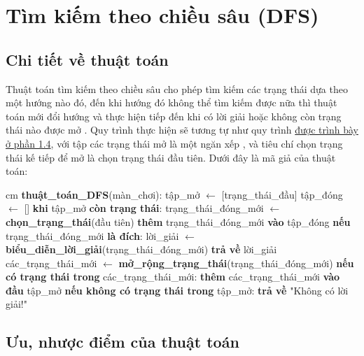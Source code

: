 \section{Tìm kiếm theo chiều sâu (DFS)}
\label{DFS}
\subsection{Chi tiết về thuật toán}
Thuật toán tìm kiếm theo chiều sâu cho phép tìm kiếm các trạng thái dựa theo một hướng nào đó, đến khi hướng đó không thể tìm kiếm được nữa thì thuật toán mới đổi hướng và thực hiện tiếp đến khi có lời giải hoặc không còn trạng thái nào được mở \cite{AI_HCMUS} \cite{discrete-advanced}. Quy trình thực hiện sẽ tương tự như quy trình \hyperref[algo-struct]{được trình bày ở phần 1.4}, với tập các trạng thái mở là một ngăn xếp \cite{AI_HCMUS}, và tiêu chí chọn trạng thái kế tiếp để mở là chọn trạng thái đầu tiên. Dưới đây là mã giả của thuật toán:

 cm
\textbf{thuật\_toán\_DFS}(màn\_chơi): \newline
\indent\indent tập\_mở $\gets$ [trạng\_thái\_đầu] \newline
\indent\indent tập\_đóng $\gets$ [] \newline
\indent\indent \textbf{khi} tập\_mở \textbf{còn trạng thái}: \newline
\indent\indent\indent trạng\_thái\_đóng\_mới $\gets$ \textbf{chọn\_trạng\_thái}(đầu tiên) \newline
\indent\indent\indent \textbf{thêm} trạng\_thái\_đóng\_mới \textbf{vào} tập\_đóng \newline
\indent\indent\indent \textbf{nếu} trạng\_thái\_đóng\_mới \textbf{là đích}: \newline
\indent\indent\indent\indent lời\_giải $\gets$ \textbf{biểu\_diễn\_lời\_giải}(trạng\_thái\_đóng\_mới) \newline
\indent\indent\indent\indent \textbf{trả về} lời\_giải \newline
\indent\indent\indent các\_trạng\_thái\_mới $\gets$ \textbf{mở\_rộng\_trạng\_thái}(trạng\_thái\_đóng\_mới) \newline
\indent\indent\indent \textbf{nếu có trạng thái trong}  các\_trạng\_thái\_mới: \newline
\indent\indent\indent\indent \textbf{thêm} các\_trạng\_thái\_mới \textbf{vào đầu} tập\_mở \newline
\indent\indent\indent \textbf{nếu không có trạng thái trong} tập\_mở: \newline
\indent\indent\indent\indent \textbf{trả về} "Không có lời giải!"
\subsection{Ưu, nhược điểm của thuật toán}